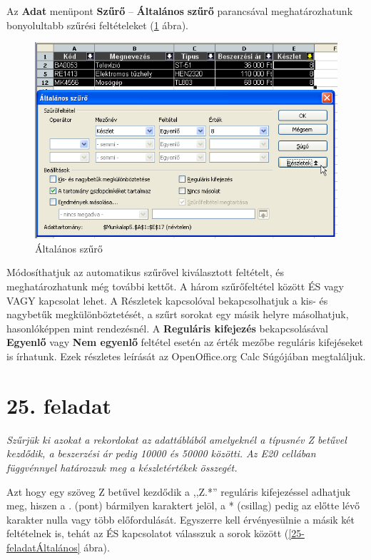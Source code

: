 Az \textbf{Adat} menüpont \textbf{Szűrő} --
\textbf{Általános} \textbf{szűrő} parancsával
meghatározhatunk bonyolultabb szűrési feltételeket (\ref{ÁltalánosSzűrő}
ábra).

\begin{figure}[!h]
\begin{center}
\includegraphics[width=13.743cm]{oocalcv2-img115.png}
\caption{Általános szűrő}\label{ÁltalánosSzűrő}
\end{center}
\end{figure}

Módosíthatjuk az automatikus szűrővel kiválasztott
feltételt, és meghatározhatunk még további kettőt. A
három szűrőfeltétel között ÉS vagy VAGY kapcsolat
lehet. A Részletek kapcsolóval bekapcsolhatjuk a kis- és
nagybetűk megkülönböztetését, a szűrt sorokat egy
másik helyre másolhatjuk, hasonlóképpen mint rendezésnél. A
\textbf{Reguláris kifejezés} bekapcsolásával
\textbf{Egyenlő} vagy \textbf{Nem egyenlő} feltétel esetén
az érték mezőbe reguláris kifejéseket is írhatunk. Ezek
részletes leírását az OpenOffice.org Calc Súgójában
megtaláljuk.


\section{25. feladat}

{\itshape
Szűrjük ki azokat a rekordokat az adattáblából amelyeknél
a típusnév Z betűvel kezdődik, a beszerzési ár pedig
10000 és 50000 közötti. Az E20 cellában függvénnyel
határozzuk meg a készletértékek összegét.}

Azt hogy egy szöveg Z betűvel kezdődik a
,,Z.*'' reguláris kifejezéssel
adhatjuk meg, hiszen a . (pont) bármilyen karaktert jelöl, a *
(csillag) pedig az előtte lévő karakter nulla vagy több
előfordulását. Egyszerre kell érvényesülnie a másik
két feltételnek is, tehát az ÉS kapcsolatot válasszuk a sorok
között (\ref{25-feladatÁltalános} ábra).

